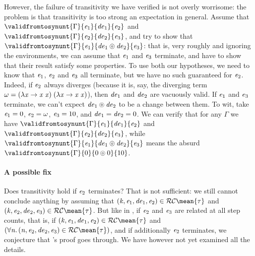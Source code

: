 However, the failure of transitivity we have verified is not
overly worrisome: the problem is that transitivity is too strong
an expectation in general. Assume that \ensuremath{\validfromtosynunt{\Gamma}{\Varid{e}_{1}}{\Varid{de}_{1}}{\Varid{e}_{2}}} and \ensuremath{\validfromtosynunt{\Gamma}{\Varid{e}_{2}}{\Varid{de}_{2}}{\Varid{e}_{3}}}, and try to show
that \ensuremath{\validfromtosynunt{\Gamma}{\Varid{e}_{1}}{\Varid{de}_{1}\circledcirc \Varid{de}_{2}}{\Varid{e}_{3}}}: that
is, very roughly and ignoring the environments, we can assume
that \ensuremath{\Varid{e}_{1}} and \ensuremath{\Varid{e}_{3}} terminate, and have to show that their result
satisfy some properties. To use both our hypotheses, we need to
know that \ensuremath{\Varid{e}_{1}}, \ensuremath{\Varid{e}_{2}} and \ensuremath{\Varid{e}_{3}} all terminate, but we have no such
guaranteed for \ensuremath{\Varid{e}_{2}}. Indeed, if \ensuremath{\Varid{e}_{2}} always diverges (because it
is, say, the diverging term \ensuremath{\omega\mathrel{=}(\lambda \Varid{x}\to \Varid{x}\;\Varid{x})\;(\lambda \Varid{x}\to \Varid{x}\;\Varid{x})}), then \ensuremath{\Varid{de}_{1}} and \ensuremath{\Varid{de}_{2}}
are vacuously valid. If \ensuremath{\Varid{e}_{1}} and \ensuremath{\Varid{e}_{3}} terminate, we can't expect
\ensuremath{\Varid{de}_{1}\circledcirc \Varid{de}_{2}} to be a change between them. To wit, take
\ensuremath{\Varid{e}_{1}\mathrel{=}\mathrm{0}}, \ensuremath{\Varid{e}_{2}\mathrel{=}\omega}, \ensuremath{\Varid{e}_{3}\mathrel{=}\mathrm{10}}, and \ensuremath{\Varid{de}_{1}\mathrel{=}\Varid{de}_{2}\mathrel{=}\mathrm{0}}. We can
verify that for any \ensuremath{\Gamma} we have \ensuremath{\validfromtosynunt{\Gamma}{\Varid{e}_{1}}{\Varid{de}_{1}}{\Varid{e}_{2}}} and
\ensuremath{\validfromtosynunt{\Gamma}{\Varid{e}_{2}}{\Varid{de}_{2}}{\Varid{e}_{3}}}, while \ensuremath{\validfromtosynunt{\Gamma}{\Varid{e}_{1}}{\Varid{de}_{1}\circledcirc \Varid{de}_{2}}{\Varid{e}_{3}}} means the absurd
\ensuremath{\validfromtosynunt{\Gamma}{\mathrm{0}}{\mathrm{0}\circledcirc \mathrm{0}}{\mathrm{10}}}.

\paragraph{A possible fix}
Does transitivity hold if \ensuremath{\Varid{e}_{2}} terminates? That is not sufficient: we still
cannot conclude anything by assuming that \ensuremath{(\Varid{k},\Varid{e}_{1},\Varid{de}_{1},\Varid{e}_{2})\in \mathcal{RC}\mean{\tau}} and
\ensuremath{(\Varid{k},\Varid{e}_{2},\Varid{de}_{2},\Varid{e}_{3})\in \mathcal{RC}\mean{\tau}}.
But like in \citet{Ahmed2006stepindexed}, if \ensuremath{\Varid{e}_{2}} and \ensuremath{\Varid{e}_{3}} are
related at all step counts, that is, if \ensuremath{(\Varid{k},\Varid{e}_{1},\Varid{de}_{1},\Varid{e}_{2})\in \mathcal{RC}\mean{\tau}} and \ensuremath{(\forall \Varid{n}\hsforall \hsdot{\circ }{\mathpunct{.}}(\Varid{n},\Varid{e}_{2},\Varid{de}_{2},\Varid{e}_{3})\in \mathcal{RC}\mean{\tau})}, and if additionally \ensuremath{\Varid{e}_{2}} terminates, we conjecture that
\citeauthor{Ahmed2006stepindexed}'s proof goes through. We have
however not yet examined all the details.

